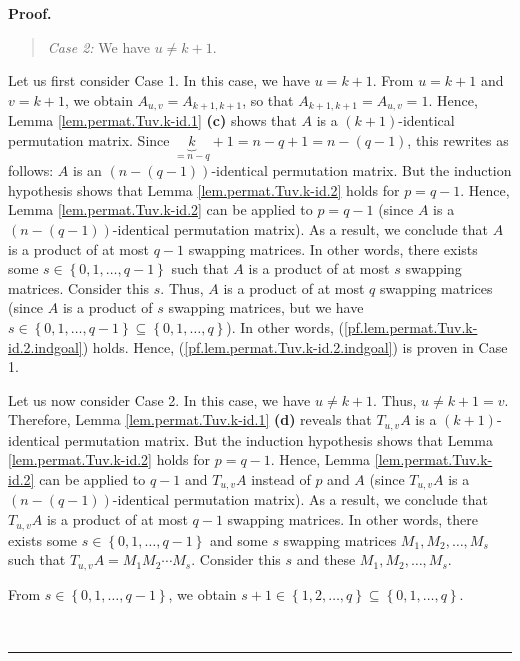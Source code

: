 \documentclass[numbers=enddot,12pt,final,onecolumn,notitlepage]{scrartcl}%
\theoremstyle{definition}
\newenvironment{statement}{\begin{quote}}{\end{quote}}
\newenvironment{proof}[1][Proof]{\noindent\textbf{#1.} }{\ \rule{0.5em}{0.5em}}
\begin{document}
\begin{proof}
\begin{statement}
\textit{Case 2:} We have $u\neq k+1$.
\end{statement}

Let us first consider Case 1. In this case, we have $u=k+1$. From $u=k+1$ and
$v=k+1$, we obtain $A_{u,v}=A_{k+1,k+1}$, so that $A_{k+1,k+1}=A_{u,v}=1$.
Hence, Lemma \ref{lem.permat.Tuv.k-id.1} \textbf{(c)} shows that $A$ is a
$\left(  k+1\right)  $-identical permutation matrix. Since $\underbrace{k}%
_{=n-q}+1=n-q+1=n-\left(  q-1\right)  $, this rewrites as follows: $A$ is an
$\left(  n-\left(  q-1\right)  \right)  $-identical permutation matrix. But
the induction hypothesis shows that Lemma \ref{lem.permat.Tuv.k-id.2} holds
for $p=q-1$. Hence, Lemma \ref{lem.permat.Tuv.k-id.2} can be applied to
$p=q-1$ (since $A$ is a $\left(  n-\left(  q-1\right)  \right)  $-identical
permutation matrix). As a result, we conclude that $A$ is a product of at most
$q-1$ swapping matrices. In other words, there exists some $s\in\left\{
0,1,\ldots,q-1\right\}  $ such that $A$ is a product of at most $s$ swapping
matrices. Consider this $s$. Thus, $A$ is a product of at most $q$ swapping
matrices (since $A$ is a product of $s$ swapping matrices, but we have
$s\in\left\{  0,1,\ldots,q-1\right\}  \subseteq\left\{  0,1,\ldots,q\right\}
$). In other words, (\ref{pf.lem.permat.Tuv.k-id.2.indgoal}) holds. Hence,
(\ref{pf.lem.permat.Tuv.k-id.2.indgoal}) is proven in Case 1.

Let us now consider Case 2. In this case, we have $u\neq k+1$. Thus, $u\neq
k+1=v$. Therefore, Lemma \ref{lem.permat.Tuv.k-id.1} \textbf{(d)} reveals that
$T_{u,v}A$ is a $\left(  k+1\right)  $-identical permutation matrix. But the
induction hypothesis shows that Lemma \ref{lem.permat.Tuv.k-id.2} holds for
$p=q-1$. Hence, Lemma \ref{lem.permat.Tuv.k-id.2} can be applied to $q-1$ and
$T_{u,v}A$ instead of $p$ and $A$ (since $T_{u,v}A$ is a $\left(  n-\left(
q-1\right)  \right)  $-identical permutation matrix). As a result, we conclude
that $T_{u,v}A$ is a product of at most $q-1$ swapping matrices. In other
words, there exists some $s\in\left\{  0,1,\ldots,q-1\right\}  $ and some $s$
swapping matrices $M_{1},M_{2},\ldots,M_{s}$ such that $T_{u,v}A=M_{1}%
M_{2}\cdots M_{s}$. Consider this $s$ and these $M_{1},M_{2},\ldots,M_{s}$.

From $s\in\left\{  0,1,\ldots,q-1\right\}  $, we obtain $s+1\in\left\{
1,2,\ldots,q\right\}  \subseteq\left\{  0,1,\ldots,q\right\}  $.


\end{proof}
\end{document}
